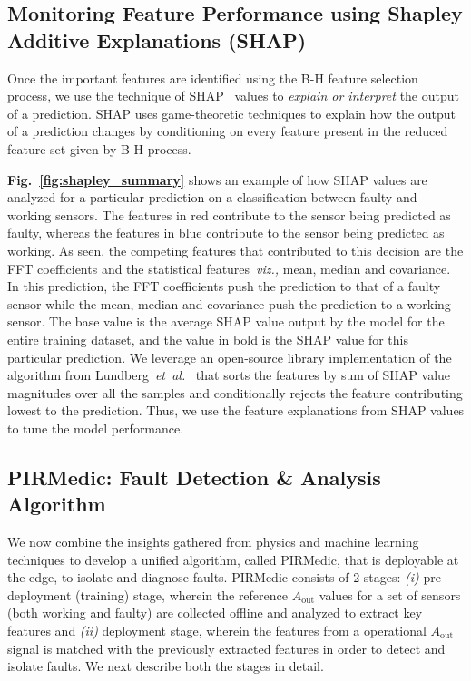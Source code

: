 \documentclass[manuscript]{acmart}
\newcommand{\viz}{{\it viz.,}\xspace}
\newcommand{\etal}{{\it et~al.}\xspace}
\newcommand{\ci}{{\it (i) }}
\newcommand{\cii}{{\it (ii) }}
\newcommand{\aout}{$A_{\text{out}}$\xspace}
\newcommand{\sol}{{PIRMedic}\xspace}
\begin{document}
\subsection{Monitoring Feature Performance using Shapley Additive Explanations (SHAP)} \label{subsec:shap} Once the important features are identified using the B-H feature selection process, we use the technique of SHAP~\cite{NIPS2017_8a20a862} values to \textit{explain or interpret} the output of a prediction. SHAP uses game-theoretic techniques to explain how the output of a prediction changes by conditioning on every feature present in the reduced feature set given by B-H process.  




{\bfseries Fig.~\ref{fig:shapley_summary}} shows an example of how SHAP values are analyzed for a particular prediction on a classification between faulty and working sensors. The features in red contribute to the sensor being predicted as faulty, whereas the features in blue contribute to the sensor being predicted as working. As seen, the competing features that contributed to this decision are the FFT coefficients and the statistical features~\viz mean, median and covariance. 
In this prediction, the FFT coefficients push the prediction to that of a faulty sensor while the mean, median and covariance push the prediction to a working sensor. The base value is the average SHAP value output by the model for the entire training dataset, and the value in bold is the SHAP value for this particular prediction. We leverage an open-source library implementation of the algorithm from Lundberg~\etal~\cite{NIPS2017_8a20a862, shap_implementation} that sorts the features by sum of SHAP value magnitudes over all the samples and conditionally rejects the feature contributing lowest to the prediction. Thus, we use the feature explanations from SHAP values to tune the model performance. 

\subsection{\sol: Fault Detection \& Analysis Algorithm}
\label{subsec:high_level_algorithm}
We now combine the insights gathered from physics and machine learning techniques to develop a unified algorithm, called \sol, that is deployable at the edge, to isolate and diagnose faults.
\sol consists of 2 stages: \ci pre-deployment (training) stage, wherein the reference \aout values for a set of sensors (both working and faulty) are collected offline and analyzed to extract key features and \cii deployment stage, wherein the features from a operational \aout signal is matched with the previously extracted features in order to detect and isolate faults. We next describe both the stages in detail.
\end{document}
